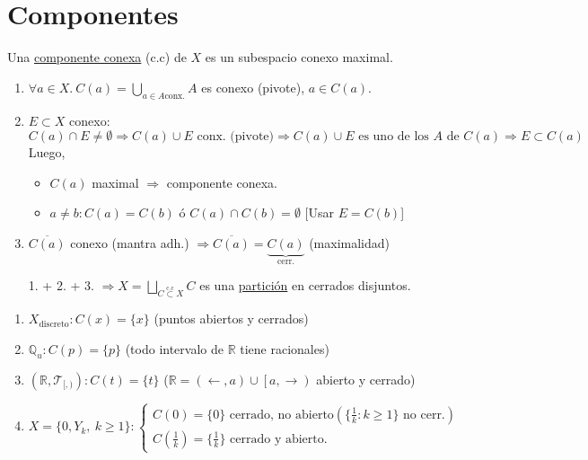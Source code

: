 \section{Componentes}%
\label{sec:componentes}
\begin{defi}
Una \underline{componente conexa} (c.c) de $X$ es un subespacio conexo maximal.
\end{defi}

\begin{prop}
\begin{enumerate}
    \item $\forall a \in X.\ C\left( a \right) = \bigcup_{a \in A \text{conx.}} A$ es conexo (pivote), $a \in C\left( a \right)$.
    \item $E \subset X$ conexo: 
    \[
    C\left( a \right) \cap E \neq \emptyset \Rightarrow C\left( a \right) \cup E \text{ conx. (pivote)} \Rightarrow C\left( a \right) \cup E \text{ es uno de los } A \text{ de } C\left( a \right) \Rightarrow E \subset C\left( a \right) 
    \]
    Luego, 
    \begin{itemize}
        \item $C\left( a \right)$ maximal $\Rightarrow$ componente conexa.
        \item $a \neq b: C\left( a \right) = C\left( b \right)$ ó $C\left( a \right) \cap C\left( b \right) = \emptyset$ [Usar $E = C\left( b \right)$]
    \end{itemize}

    \item $\overline{C\left( a \right)}$ conexo (mantra adh.) $\Rightarrow \overline{C\left( a \right)} = \underbrace{C\left( a \right)}_{\text{cerr.}}$ (maximalidad)
    \item[1. + 2. + 3.] $\Rightarrow X = \bigsqcup_{C \stackrel{\text{c.c}}{\subset}  X} C$ es una \underline{partición} en cerrados disjuntos.
\end{enumerate} 
\end{prop}

\begin{ej}
\begin{enumerate}
    \item $X_{\text{discreto}}: C\left( x \right) = \{x\}$ (puntos abiertos y cerrados)
    \item $\mathbb{Q}_u : C\left( p \right) = \{p\}$ (todo intervalo de $\mathbb{R}$ tiene racionales)
    \item $\left( \mathbb{R}, \mathcal{T}_{[, )} \right): C\left( t \right) = \{t\}$ ($\mathbb{R} = \left( \leftarrow, a \right) \cup \left[ a, \rightarrow \right)$ abierto y cerrado)
    \item $X = \{0, Y_k,\ k \ge 1\} : \begin{cases}
        C\left( 0 \right) = \{0\} \text{ cerrado, no abierto} \left( \{\frac{1}{k}: k\ge 1 \}  \text{ no cerr.}\right)\\
        C\left( \frac{1}{k} \right) = \{\frac{1}{k}\} \text{ cerrado y abierto.} 
    \end{cases} $
\end{enumerate}
\end{ej}


